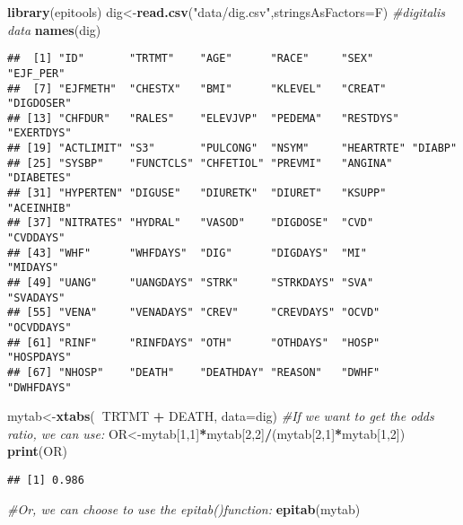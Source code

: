 \documentclass[]{book}
\newenvironment{Shaded}{\begin{snugshade}}{\end{snugshade}}
\newcommand{\KeywordTok}[1]{\textcolor[rgb]{0.13,0.29,0.53}{\textbf{#1}}}
\newcommand{\DataTypeTok}[1]{\textcolor[rgb]{0.13,0.29,0.53}{#1}}
\newcommand{\DecValTok}[1]{\textcolor[rgb]{0.00,0.00,0.81}{#1}}
\newcommand{\StringTok}[1]{\textcolor[rgb]{0.31,0.60,0.02}{#1}}
\newcommand{\CommentTok}[1]{\textcolor[rgb]{0.56,0.35,0.01}{\textit{#1}}}
\newcommand{\OperatorTok}[1]{\textcolor[rgb]{0.81,0.36,0.00}{\textbf{#1}}}
\newcommand{\NormalTok}[1]{#1}
\theoremstyle{definition}
\theoremstyle{definition}
\theoremstyle{definition}
\theoremstyle{remark}
\begin{document}
\begin{Shaded}
\begin{Highlighting}[]
\KeywordTok{library}\NormalTok{(epitools)}
\NormalTok{dig<-}\KeywordTok{read.csv}\NormalTok{(}\StringTok{"data/dig.csv"}\NormalTok{,}\DataTypeTok{stringsAsFactors=}\NormalTok{F) }\CommentTok{#digitalis data}
\KeywordTok{names}\NormalTok{(dig)}
\end{Highlighting}
\end{Shaded}

\begin{verbatim}
##  [1] "ID"       "TRTMT"    "AGE"      "RACE"     "SEX"      "EJF_PER" 
##  [7] "EJFMETH"  "CHESTX"   "BMI"      "KLEVEL"   "CREAT"    "DIGDOSER"
## [13] "CHFDUR"   "RALES"    "ELEVJVP"  "PEDEMA"   "RESTDYS"  "EXERTDYS"
## [19] "ACTLIMIT" "S3"       "PULCONG"  "NSYM"     "HEARTRTE" "DIABP"   
## [25] "SYSBP"    "FUNCTCLS" "CHFETIOL" "PREVMI"   "ANGINA"   "DIABETES"
## [31] "HYPERTEN" "DIGUSE"   "DIURETK"  "DIURET"   "KSUPP"    "ACEINHIB"
## [37] "NITRATES" "HYDRAL"   "VASOD"    "DIGDOSE"  "CVD"      "CVDDAYS" 
## [43] "WHF"      "WHFDAYS"  "DIG"      "DIGDAYS"  "MI"       "MIDAYS"  
## [49] "UANG"     "UANGDAYS" "STRK"     "STRKDAYS" "SVA"      "SVADAYS" 
## [55] "VENA"     "VENADAYS" "CREV"     "CREVDAYS" "OCVD"     "OCVDDAYS"
## [61] "RINF"     "RINFDAYS" "OTH"      "OTHDAYS"  "HOSP"     "HOSPDAYS"
## [67] "NHOSP"    "DEATH"    "DEATHDAY" "REASON"   "DWHF"     "DWHFDAYS"
\end{verbatim}

\begin{Shaded}
\begin{Highlighting}[]
\NormalTok{mytab<-}\KeywordTok{xtabs}\NormalTok{(}\OperatorTok{~}\NormalTok{TRTMT }\OperatorTok{+}\StringTok{ }\NormalTok{DEATH, }\DataTypeTok{data=}\NormalTok{dig)}
\CommentTok{#If we want to get the odds ratio, we can use:}
\NormalTok{OR<-mytab[}\DecValTok{1}\NormalTok{,}\DecValTok{1}\NormalTok{]}\OperatorTok{*}\NormalTok{mytab[}\DecValTok{2}\NormalTok{,}\DecValTok{2}\NormalTok{]}\OperatorTok{/}\NormalTok{(mytab[}\DecValTok{2}\NormalTok{,}\DecValTok{1}\NormalTok{]}\OperatorTok{*}\NormalTok{mytab[}\DecValTok{1}\NormalTok{,}\DecValTok{2}\NormalTok{])}
\KeywordTok{print}\NormalTok{(OR)}
\end{Highlighting}
\end{Shaded}

\begin{verbatim}
## [1] 0.986
\end{verbatim}

\begin{Shaded}
\begin{Highlighting}[]
\CommentTok{#Or, we can choose to use the epitab()function:}
\KeywordTok{epitab}\NormalTok{(mytab)}
\end{Highlighting}
\end{Shaded}
\end{document}
